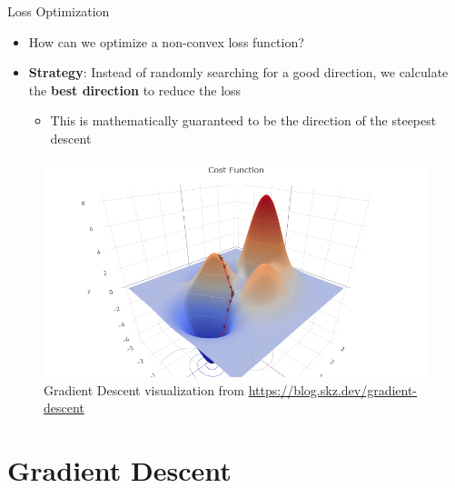 \documentclass[serif, aspectratio=169]{beamer}
\begin{document}
\begin{frame}{Loss Optimization}
    \begin{minipage}{0.5\linewidth}
    \begin{itemize}
        \item How can we optimize a non-convex loss function?
        \item \textbf{Strategy}: Instead of randomly searching for a good direction, we calculate the \textbf{best direction} to reduce the loss
        \begin{itemize}
            \item  This is mathematically guaranteed to be the direction of the steepest descent
        \end{itemize}
    \end{itemize}
    \end{minipage}%
    \begin{minipage}{0.5\linewidth}
        \begin{figure}[h]
            \centering
            \includegraphics[height=.6\textheight]{pic/gradient_descent_blog.skz.dev.png}
            \caption{\footnotesize Gradient Descent visualization from \url{https://blog.skz.dev/gradient-descent}}
        \end{figure}
    \end{minipage}
\end{frame}


\section{Gradient Descent}
\end{document}
